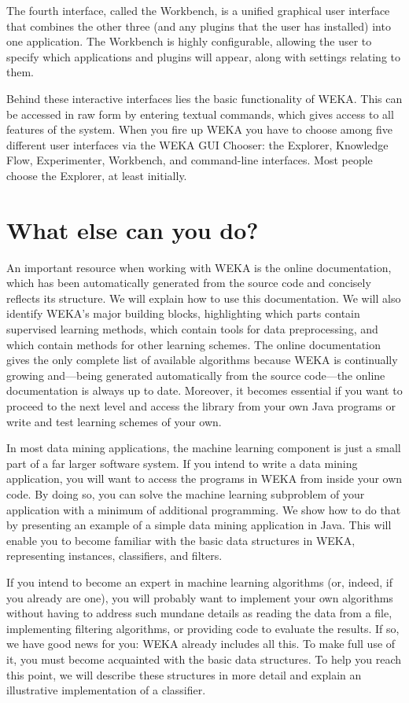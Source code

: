 The fourth interface, called the Workbench, is a unified graphical
user interface that combines the other three (and any plugins that the
user has installed) into one application. The Workbench is highly
configurable, allowing the user to specify which applications and
plugins will appear, along with settings relating to them.  

Behind these interactive interfaces lies the basic functionality of
WEKA. This can be accessed in raw form by entering textual commands,
which gives access to all features of the system. When you fire up
WEKA you have to choose among five different user interfaces via the
WEKA GUI Chooser: the Explorer, Knowledge Flow, Experimenter,
Workbench, and command-line interfaces. Most people choose the
Explorer, at least initially.


\section{What else can you do?}

An important resource when working with WEKA is the online
documentation, which has been automatically generated from the source
code and concisely reflects its structure. We will explain how to use
this documentation. We will also identify WEKA's major building
blocks, highlighting which parts contain supervised learning methods,
which contain tools for data preprocessing, and which contain methods
for other learning schemes. The online documentation gives the only
complete list of available algorithms because WEKA is continually
growing and---being generated automatically from the source code---the
online documentation is always up to date. Moreover, it becomes
essential if you want to proceed to the next level and access the
library from your own Java programs or write and test learning schemes
of your own.

In most data mining applications, the machine learning component is
just a small part of a far larger software system. If you intend to
write a data mining application, you will want to access the programs
in WEKA from inside your own code. By doing so, you can solve the
machine learning subproblem of your application with a minimum of
additional programming. We show how to do that by presenting an
example of a simple data mining application in Java. This will enable
you to become familiar with the basic data structures in WEKA,
representing instances, classifiers, and filters.

If you intend to become an expert in machine learning algorithms (or,
indeed, if you already are one), you will probably want to implement
your own algorithms without having to address such mundane details as
reading the data from a file, implementing filtering algorithms, or
providing code to evaluate the results. If so, we have good news for
you: WEKA already includes all this. To make full use of it, you must
become acquainted with the basic data structures. To help you reach
this point, we will describe these structures in more detail and
explain an illustrative implementation of a classifier.

